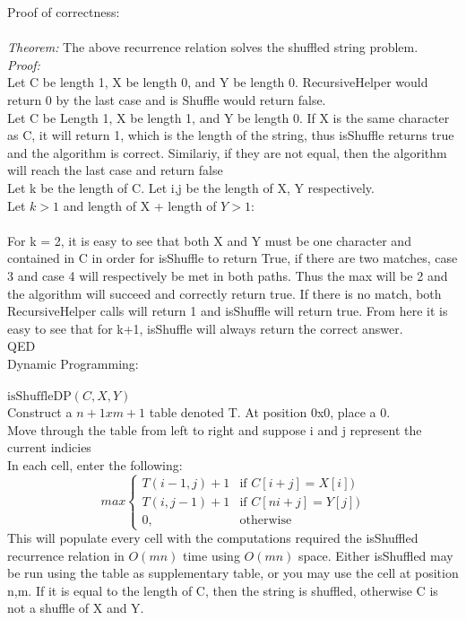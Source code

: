 \documentclass{article}
\begin{document}
\begin{enumerate}
Proof of correctness:\\
\\
\emph{Theorem:} The above recurrence relation solves the shuffled string problem. \\
\emph{Proof:} \\
Let C be length 1, X be length 0, and Y be length 0. RecursiveHelper would return 0 by the last case and is Shuffle would return false. \\
Let C be Length 1, X be length 1, and Y be length 0. If X is the same character as C, it will return 1, which is the length of the string, thus isShuffle returns true and the algorithm is correct. Similariy, if they are not equal, then the algorithm will reach the last case and return false\\
Let k be the length of C. Let i,j be the length of X, Y respectively. \\
Let $k > 1$ and length of X + length of $Y > 1$: \\
\\
For k = 2, it is easy to see that both X and Y must be one character and contained in C in order for isShuffle to return True, if there are two matches, case 3 and case 4 will respectively be met in both paths. Thus the max will be 2 and the algorithm will succeed and correctly return true. If there is no match, both RecursiveHelper calls will return 1 and isShuffle will return true. From here it is easy to see that for k+1, isShuffle will always return the correct answer.
\\
QED\\

Dynamic Programming:\\
\\
$\text{isShuffleDP}(C, X, Y)$\\

Construct a $n+1 x m+1$ table denoted T. At position 0x0, place a 0. \\
Move through the table from left to right and suppose i and j represent the current indicies\\
In each cell, enter the following: \\
    \[
     max
    \begin{cases}
        T(i - 1, j) + 1  & \text{if } C[i+j] = X[i])\\
        T(i, j - 1) + 1  & \text{if } C[ni+j] = Y[j])\\
        0, & \text{otherwise}
    \end{cases}
    \]
This will populate every cell with the computations required the isShuffled recurrence relation in $O(mn)$ time using $O(mn)$ space. Either isShuffled may be run using the table as supplementary table, or you may use the cell at position n,m. If it is equal to the length of C, then the string is shuffled, otherwise C is not a shuffle of X and Y.



\end{enumerate}
\end{document}
